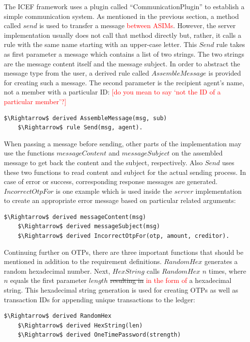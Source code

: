 The ICEF framework uses a plugin called ``CommunicationPlugin'' to establish a simple communication system. As mentioned in the previous section, a method called $send$ is used to transfer a message \textcolor{red}{between ASIMs}. However, the server implementation usually does not call that method directly but, rather, it calls a rule with the same name starting with an upper-case letter. This $Send$ rule takes as first parameter a message which contains a list of two strings. The two strings are the message content itself and the message subject. In order to abstract the message type from the user, a derived rule called $AssembleMessage$ is provided for creating such a message. The second parameter is the recipient agent's name, not a member with a particular ID: \textcolor{red}{[do you mean to say `not the ID of a particular member'?]}
\begin{lstlisting}[language=bsl,mathescape=true]
	$\Rightarrow$ derived AssembleMessage(msg, sub)	
	$\Rightarrow$ rule Send(msg, agent).
\end{lstlisting}

When passing a message before sending, other parts of the implementation may use the functions $messageContent$ and $messageSubject$ on the assembled message to get back the content and the subject, respectively. Also $Send$ uses these two functions to read content and subject for the actual sending process. In case of error or success, corresponding response messages are generated. $IncorrectOtpFor$ is one example which is used inside the $server$ implementation to create an appropriate error message based on particular related arguments:
\begin{lstlisting}[language=bsl,mathescape=true]
	$\Rightarrow$ derived messageContent(msg)
	$\Rightarrow$ derived messageSubject(msg)
	$\Rightarrow$ derived IncorrectOtpFor(otp, amount, creditor).
\end{lstlisting}

Continuing further on OTPs, there are three important functions that should be mentioned in addition to the requirement definitions. $RandomHex$ generates a random hexadecimal number. Next, $HexString$ calls $RandomHex$ $n$ times, where $n$ equals the first parameter $length$ \st{resulting in} \textcolor{red}{in the form of} a hexadecimal string. This hexadecimal string generation is used for creating OTPs as well as transaction IDs for appending unique transactions to the ledger:

\begin{lstlisting}[language=bsl,mathescape=true]
	$\Rightarrow$ derived RandomHex
	$\Rightarrow$ derived HexString(len)
	$\Rightarrow$ derived OneTimePassword(strength)
\end{lstlisting}

